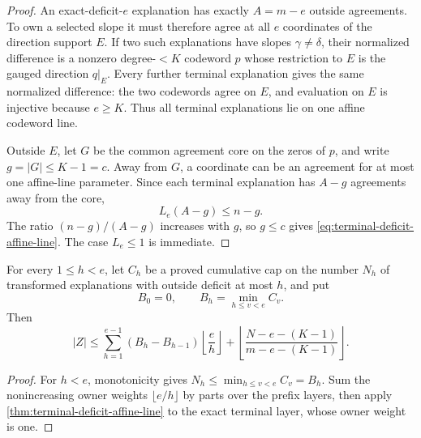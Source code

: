 \documentclass[11pt,a4paper]{amsart}
\numberwithin{equation}{section}
\theoremstyle{remark}
\begin{document}
\begin{proof}
An exact-deficit-\(e\) explanation has exactly \(A=m-e\) outside
agreements.  To own a selected slope it must therefore agree at all \(e\)
coordinates of the direction support \(E\).  If two such explanations have
slopes \(\gamma\ne\delta\), their normalized difference is a nonzero
degree-\(<K\) codeword \(p\) whose restriction to \(E\) is the gauged
direction \(q|_E\).  Every further terminal explanation gives the same
normalized difference: the two codewords agree on \(E\), and evaluation on
\(E\) is injective because \(e\ge K\).  Thus all terminal explanations lie
on one affine codeword line.

Outside \(E\), let \(G\) be the common agreement core on the zeros of
\(p\), and write \(g=|G|\le K-1=c\).  Away from \(G\), a coordinate can be
an agreement for at most one affine-line parameter.  Since each terminal
explanation has \(A-g\) agreements away from the core,
\[
 L_e(A-g)\le n-g.
\]
The ratio \((n-g)/(A-g)\) increases with \(g\), so \(g\le c\) gives
\eqref{eq:terminal-deficit-affine-line}.  The case \(L_e\le1\) is
immediate.
\end{proof}

\begin{corollary}
\label{cor:prefix-terminal-sparse-direction-profile}
For every \(1\le h<e\), let \(C_h\) be a proved cumulative cap on the
number \(N_h\) of transformed explanations with outside deficit at most
\(h\), and put
\[
 B_0=0,
 \qquad B_h=\min_{h\le v<e}C_v.
\]
Then
\begin{equation}
 |Z|\le
 \sum_{h=1}^{e-1}(B_h-B_{h-1})\left\lfloor\frac eh\right\rfloor
 +\left\lfloor\frac{N-e-(K-1)}{m-e-(K-1)}\right\rfloor.
 \label{eq:prefix-terminal-sparse-direction-profile}
\end{equation}
\end{corollary}

\begin{proof}
For \(h<e\), monotonicity gives
\(N_h\le\min_{h\le v<e}C_v=B_h\).  Sum the nonincreasing owner weights
\(\lfloor e/h\rfloor\) by parts over the prefix layers, then apply
\cref{thm:terminal-deficit-affine-line} to the exact terminal layer, whose
owner weight is one.
\end{proof}
\end{document}
